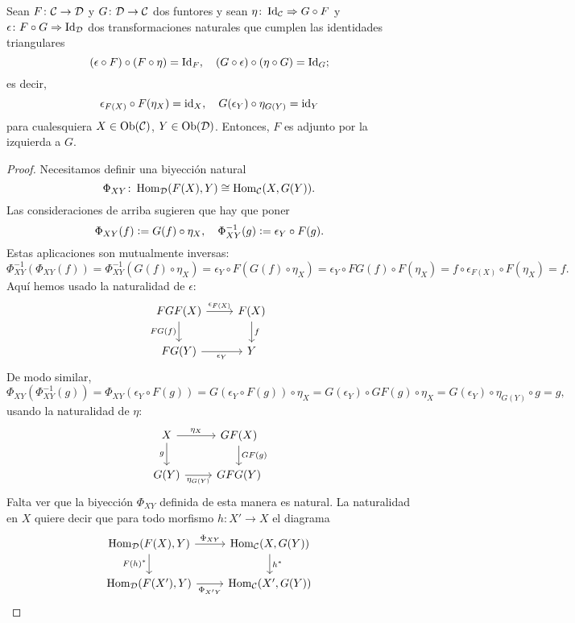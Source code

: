 \documentclass{article}
\numberwithin{equation}{section}
\theoremstyle{definition}
\begin{document}
\begin{proposicion}
  Sean $F\colon \mathcal{C}\to\mathcal{D}$ y $G\colon \mathcal{D}\to\mathcal{C}$ dos
  funtores y sean $\eta\colon \operatorname{Id}_\mathcal{C} \Rightarrow G\circ F$ y
  $\epsilon\colon F\circ G\Rightarrow \operatorname{Id}_\mathcal{D}$ dos transformaciones
  naturales que cumplen las identidades triangulares
  \[ (\epsilon\circ F)\circ (F\circ \eta) = \operatorname{Id}_F, \quad
     (G\circ \epsilon)\circ (\eta\circ G) = \operatorname{Id}_G; \]
  es decir,
  \[ \epsilon_{F (X)}\circ F (\eta_X) = \mathrm{id}_{X}, \quad
     G (\epsilon_Y)\circ \eta_{G (Y)} = \mathrm{id}_{Y} \]
  para cualesquiera $X\in \operatorname{Ob} (\mathcal{C})$, $Y\in \operatorname{Ob} (\mathcal{D})$.
  Entonces, $F$ es adjunto por la izquierda a $G$.

\begin{proof}
  Necesitamos definir una biyección natural
  $$\Phi_{XY}\colon\operatorname{Hom}_\mathcal{D} (F (X), Y) \cong \operatorname{Hom}_\mathcal{C} (X, G (Y)).$$
  Las consideraciones de arriba sugieren que hay que poner
  $$\Phi_{XY} (f) \mathrel{\mathop:}= G (f)\circ \eta_X, \quad \Phi_{XY}^{-1} (g) \mathrel{\mathop:}= \epsilon_Y\circ F (g).$$
  Estas aplicaciones son mutualmente inversas:
  \[ \Phi_{XY}^{-1} (\Phi_{XY} (f)) =
     \Phi_{XY}^{-1} (G (f)\circ \eta_X) =
     \epsilon_Y\circ F (G (f)\circ \eta_X) =
     \epsilon_Y\circ FG (f) \circ F (\eta_X) =
     f\circ \epsilon_{F (X)} \circ F (\eta_X) = f. \]
  Aquí hemos usado la naturalidad de $\epsilon$:
  \[ \begin{tikzcd}
      FGF (X)\ar{r}{\epsilon_{F (X)}}\ar{d}[swap]{FG (f)} & F (X)\ar{d}{f}\\
      FG (Y)\ar{r}[swap]{\epsilon_Y} & Y
    \end{tikzcd} \]
  De modo similar,
  \[ \Phi_{XY} (\Phi_{XY}^{-1} (g)) =
     \Phi_{XY} (\epsilon_Y\circ F (g)) =
     G (\epsilon_Y\circ F (g))\circ\eta_X =
     G (\epsilon_Y)\circ GF (g)\circ\eta_X =
     G (\epsilon_Y)\circ \eta_{G (Y)}\circ g = g, \]
  usando la naturalidad de $\eta$:
  \[ \begin{tikzcd}
      X\ar{d}[swap]{g}\ar{r}{\eta_X} & GF (X)\ar{d}{GF (g)}\\
      G (Y)\ar{r}[swap]{\eta_{G (Y)}} & GFG (Y)
    \end{tikzcd} \]
  Falta ver que la biyección $\Phi_{XY}$ definida de esta manera es natural. La
  naturalidad en $X$ quiere decir que para todo morfismo $h\colon X'\to X$ el
  diagrama
  \[ \begin{tikzcd}
      \Hom_\vcateg{D} (F (X), Y)\ar{r}{\Phi_{XY}}\ar{d}[swap]{F (h)^*} & \Hom_\vcateg{C} (X, G (Y))\ar{d}{h^*} \\
      \Hom_\vcateg{D} (F (X'), Y)\ar{r}[swap]{\Phi_{X'Y}} & \Hom_\vcateg{C} (X', G (Y))

\end{tikzcd}\]
\end{proof}
\end{proposicion}
\end{document}
